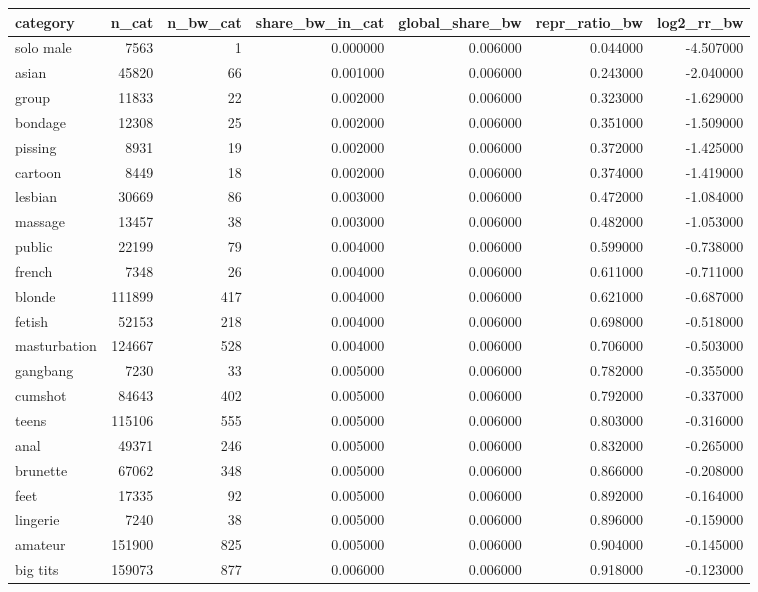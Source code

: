 \begin{tabular}{lrrrrrr}
\toprule
category & n_cat & n_bw_cat & share_bw_in_cat & global_share_bw & repr_ratio_bw & log2_rr_bw \\
\midrule
solo male & 7563 & 1 & 0.000000 & 0.006000 & 0.044000 & -4.507000 \\
asian & 45820 & 66 & 0.001000 & 0.006000 & 0.243000 & -2.040000 \\
group & 11833 & 22 & 0.002000 & 0.006000 & 0.323000 & -1.629000 \\
bondage & 12308 & 25 & 0.002000 & 0.006000 & 0.351000 & -1.509000 \\
pissing & 8931 & 19 & 0.002000 & 0.006000 & 0.372000 & -1.425000 \\
cartoon & 8449 & 18 & 0.002000 & 0.006000 & 0.374000 & -1.419000 \\
lesbian & 30669 & 86 & 0.003000 & 0.006000 & 0.472000 & -1.084000 \\
massage & 13457 & 38 & 0.003000 & 0.006000 & 0.482000 & -1.053000 \\
public & 22199 & 79 & 0.004000 & 0.006000 & 0.599000 & -0.738000 \\
french & 7348 & 26 & 0.004000 & 0.006000 & 0.611000 & -0.711000 \\
blonde & 111899 & 417 & 0.004000 & 0.006000 & 0.621000 & -0.687000 \\
fetish & 52153 & 218 & 0.004000 & 0.006000 & 0.698000 & -0.518000 \\
masturbation & 124667 & 528 & 0.004000 & 0.006000 & 0.706000 & -0.503000 \\
gangbang & 7230 & 33 & 0.005000 & 0.006000 & 0.782000 & -0.355000 \\
cumshot & 84643 & 402 & 0.005000 & 0.006000 & 0.792000 & -0.337000 \\
teens & 115106 & 555 & 0.005000 & 0.006000 & 0.803000 & -0.316000 \\
anal & 49371 & 246 & 0.005000 & 0.006000 & 0.832000 & -0.265000 \\
brunette & 67062 & 348 & 0.005000 & 0.006000 & 0.866000 & -0.208000 \\
feet & 17335 & 92 & 0.005000 & 0.006000 & 0.892000 & -0.164000 \\
lingerie & 7240 & 38 & 0.005000 & 0.006000 & 0.896000 & -0.159000 \\
amateur & 151900 & 825 & 0.005000 & 0.006000 & 0.904000 & -0.145000 \\
big tits & 159073 & 877 & 0.006000 & 0.006000 & 0.918000 & -0.123000 \\

\end{tabular}
